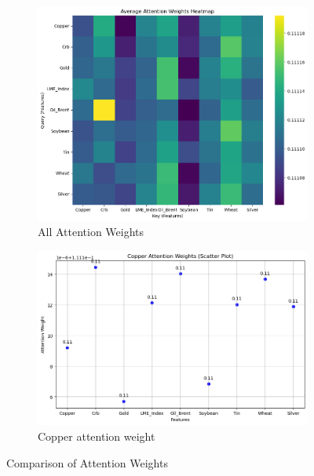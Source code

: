 \documentclass[final-report]{report-template}
\begin{document}
\begin{figure}[h]
    \centering
    \begin{subfigure}[b]{0.48\linewidth}
        \centering
        \includegraphics[width=\linewidth]{figures/attention_all_weights.png}
        \caption{All Attention Weights}
        \label{fig:all_attention_weight}
    \end{subfigure}
    \hfill
    \begin{subfigure}[b]{0.48\linewidth}
        \centering
        \includegraphics[width=\linewidth]{figures/attention_weights.png}
        \caption{Copper attention weight}
        \label{fig:copper_weight}
    \end{subfigure}
    \caption{Comparison of Attention Weights}
    \label{fig:attention_comparison}
\end{figure}
\end{document}
